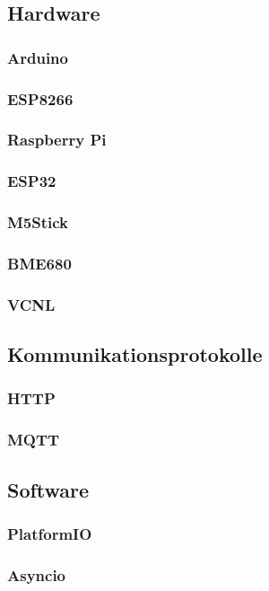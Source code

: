 \documentclass[12pt, letterpaper]{article}
\begin{document}
  \subsection{Hardware}
    \subsubsection{Arduino}
    \subsubsection{ESP8266}
    \subsubsection{Raspberry Pi}
    \subsubsection{ESP32}
    \subsubsection{M5Stick}
    \subsubsection{BME680}
    \subsubsection{VCNL}
    

  \subsection{Kommunikationsprotokolle}
  \subsubsection{HTTP}
  \subsubsection{MQTT}
    
  \subsection{Software}
  \subsubsection{PlatformIO}
    \subsubsection{Asyncio}
\end{document}
